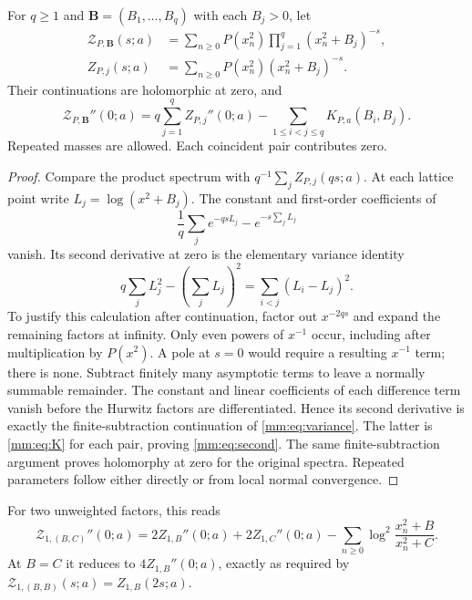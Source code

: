 \begin{theorem}
\label{mm:thm:second}
For $q\ge1$ and $\mathbf B=(B_1,\ldots,B_q)$ with each $B_j>0$,
let
\begin{align}
 \mathcal Z_{P,\mathbf B}(s;a)
 &=\sum_{n\ge0}P(x_n^2)\prod_{j=1}^{q}(x_n^2+B_j)^{-s},
 \label{mm:eq:product}\\
 Z_{P,j}(s;a)&=\sum_{n\ge0}P(x_n^2)(x_n^2+B_j)^{-s}.
 \label{mm:eq:individual}
\end{align}
Their continuations are holomorphic at zero, and
\begin{equation}\label{mm:eq:second}
 \boxed{\displaystyle
 \mathcal Z_{P,\mathbf B}''(0;a)
 =q\sum_{j=1}^{q}Z_{P,j}''(0;a)
             -\sum_{1\le i<j\le q}K_{P,a}(B_i,B_j).}
\end{equation}
Repeated masses are allowed.  Each coincident pair contributes zero.
\end{theorem}
\begin{proof}
Compare the product spectrum with
$q^{-1}\sum_jZ_{P,j}(qs;a)$.  At each lattice point write
$L_j=\log(x^2+B_j)$.  The constant and first-order coefficients of
\[
 \frac1q\sum_j e^{-qsL_j}-e^{-s\sum_jL_j}
\]
vanish.  Its second derivative at zero is the elementary variance
identity
\begin{equation}\label{mm:eq:variance}
 q\sum_jL_j^2-\left(\sum_jL_j\right)^2
                =\sum_{i<j}(L_i-L_j)^2.
\end{equation}
To justify this calculation after continuation, factor out $x^{-2qs}$
and expand the remaining factors at infinity.  Only even powers of
$x^{-1}$ occur, including after multiplication by $P(x^2)$.  A pole
at $s=0$ would require a resulting $x^{-1}$ term; there is none.
Subtract finitely many asymptotic terms to leave a normally summable
remainder.  The constant and linear coefficients of each difference
term vanish before the Hurwitz factors are differentiated.  Hence its
second derivative is exactly the finite-subtraction continuation of
\eqref{mm:eq:variance}.  The latter is
\eqref{mm:eq:K} for each pair, proving \eqref{mm:eq:second}.
The same finite-subtraction argument proves holomorphy at zero for
the original spectra.  Repeated parameters follow either directly
or from local normal convergence.
\end{proof}

For two unweighted factors, this reads
\[
 \mathcal Z_{1,(B,C)}''(0;a)
 =2Z_{1,B}''(0;a)+2Z_{1,C}''(0;a)
       -\sum_{n\ge0}\log^2\frac{x_n^2+B}{x_n^2+C}.
\]
At $B=C$ it reduces to $4Z_{1,B}''(0;a)$, exactly as required by
$\mathcal Z_{1,(B,B)}(s;a)=Z_{1,B}(2s;a)$.

